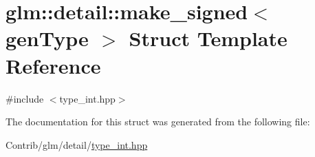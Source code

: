 \hypertarget{structglm_1_1detail_1_1make__signed}{}\section{glm\+:\+:detail\+:\+:make\+\_\+signed$<$ gen\+Type $>$ Struct Template Reference}
\label{structglm_1_1detail_1_1make__signed}


{\ttfamily \#include $<$type\+\_\+int.\+hpp$>$}



The documentation for this struct was generated from the following file\+:\begin{DoxyCompactItemize}
\item 
Contrib/glm/detail/\mbox{\hyperlink{type__int_8hpp}{type\+\_\+int.\+hpp}}\end{DoxyCompactItemize}
